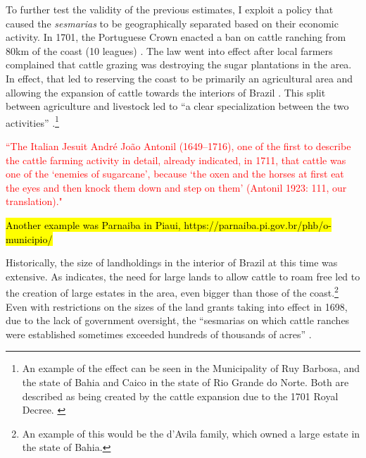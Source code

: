 \documentclass[11pt]{article}
\newcommand{\red}[1]{\textcolor{red}{#1}}
\begin{document}
To further test the validity of the previous estimates, I exploit a policy that caused the \textit{sesmarias} to be geographically separated based on their economic activity.
In 1701, the Portuguese Crown enacted a ban on cattle ranching from 80km of the coast (10 leagues) \parencites[p~.40]{Fausto2014-bh}[p~.198]{Simonsen2005-ps}[p~.460]{Bethell1984-of}. 
The law went into effect after local farmers complained that cattle grazing was destroying the sugar plantations in the area. 
In effect, that led to reserving the coast to be primarily an agricultural area and allowing the expansion of cattle towards the interiors of Brazil \parencite[p.~216]{Junior1968-iu}.
This split between agriculture and livestock led to ``a clear specialization between the two activities'' \parencite{Ribeiro2012-lb}.\footnote{An example of the effect can be seen in the Municipality of Ruy Barbosa, and the state of Bahia and Caico in the state of Rio Grande do Norte. 
Both are described as being created by the cattle expansion due to the 1701 Royal Decree. \parencite{UnknownUnknown-ro}}

\red{``The  Italian  Jesuit  André  João  Antonil  (1649–1716),  one  of  the  first  to   describe the cattle farming activity in detail, already indicated, in 1711,  that cattle was one of the ‘enemies of sugarcane’, because ‘the oxen and  the  horses  at  first  eat  the  eyes  and  then  knock  them  down  and  step  on   them’ (Antonil 1923: 111, our translation)." \parencite{Ribeiro2012-lb}}

\hl{Another example was Parnaiba in Piaui, https://parnaiba.pi.gov.br/phb/o-municipio/}


Historically, the size of landholdings in the interior of Brazil at this time was extensive. 
As \textcite[p~.41]{Fausto2014-bh} indicates, the need for large lands to allow cattle to roam free led to the creation of large estates in the area, even bigger than those of the coast.\footnote{An example of this would be the d'Avila family, which owned a large estate in the state of Bahia.}
Even with restrictions on the sizes of the land grants taking into effect in 1698, due to the lack of government oversight, the  ``sesmarias on which cattle ranches were established sometimes exceeded hundreds of thousands of acres'' \parencite{Bethell1984-of}.
\end{document}
